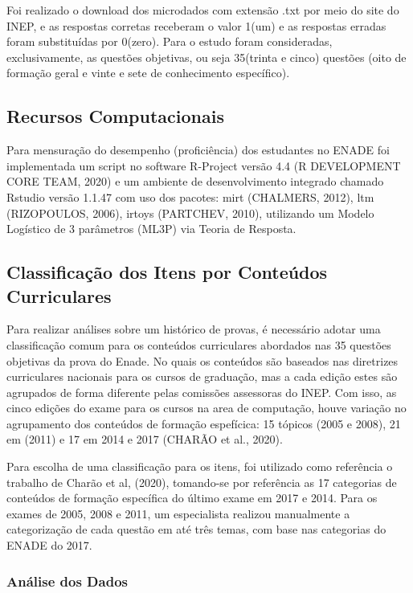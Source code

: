 \documentclass[12pt]{article}
\begin{document}
Foi realizado o download dos microdados com extensão .txt por meio do site do INEP, e as respostas corretas receberam o valor 1(um) e as respostas erradas foram substituídas por 0(zero). Para o estudo foram consideradas, exclusivamente, as questões objetivas, ou seja 35(trinta e cinco) questões (oito de formação geral e vinte e sete de conhecimento específico).

\subsection{Recursos Computacionais}
\label{sec:metbet}

Para mensuração do desempenho (proficiência) dos estudantes no ENADE foi implementada um script no software R-Project versão 4.4 (R DEVELOPMENT CORE TEAM, 2020) e um ambiente de desenvolvimento integrado chamado Rstudio versão 1.1.47 com uso dos pacotes: mirt (CHALMERS, 2012), ltm (RIZOPOULOS, 2006), irtoys (PARTCHEV, 2010), utilizando um Modelo Logístico de 3 parâmetros (ML3P) via Teoria de Resposta.

\subsection{Classificação dos Itens por Conteúdos Curriculares}

Para realizar análises sobre um histórico de provas, é necessário adotar uma classificação comum para os conteúdos curriculares abordados nas 35 questões objetivas da prova do Enade. No quais os conteúdos são baseados nas diretrizes curriculares nacionais para os cursos de graduação, mas a cada edição estes são agrupados de forma diferente pelas comissões assessoras do INEP. Com isso, as cinco edições do exame para os cursos na area de computação, houve variação no agrupamento dos conteúdos de formação espefícica: 15 tópicos (2005 e 2008), 21 em (2011) e 17 em 2014 e 2017 (CHARÃO et al., 2020).

Para escolha de uma classificação para os itens, foi utilizado como referência o trabalho de Charão et al, (2020), tomando-se por referência as 17 categorias de conteúdos de formação específica do último exame em 2017 e 2014. Para os exames de 2005, 2008 e 2011, um especialista realizou manualmente a categorização de cada questão em até três temas, com base nas categorias do ENADE do 2017. 

\subsubsection{Análise dos Dados}
\end{document}
